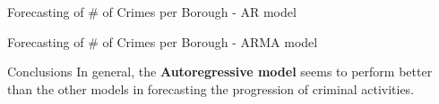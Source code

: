 \documentclass[12pt]{beamer}
\begin{document}
        \begin{frame}{Forecasting of \# of Crimes per Borough - AR model}
            \begin{figure}
                \centering
            \end{figure}
        \end{frame}

        \begin{frame}{Forecasting of \# of Crimes per Borough - ARMA model}
            \begin{figure}
                \centering
            \end{figure}
        \end{frame}

        \begin{frame}{Conclusions}
            In general, the \textbf{Autoregressive model} seems to perform better than the other models in
            forecasting the progression of criminal activities.
        \end{frame}
\end{document}
